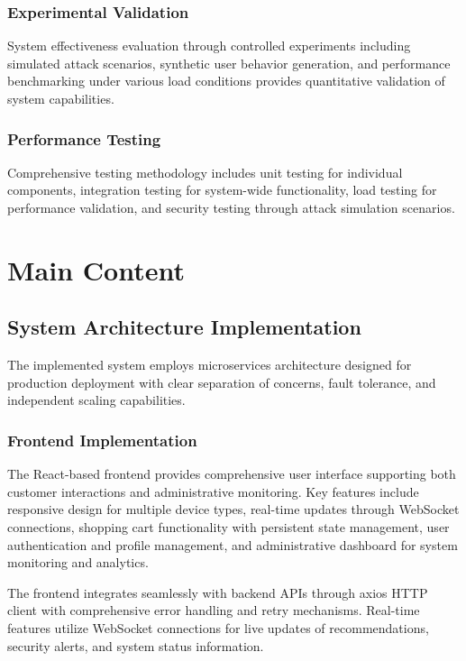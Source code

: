 \documentclass[12pt]{article}
\begin{document}
\subsubsection{Experimental Validation}
System effectiveness evaluation through controlled experiments including simulated attack scenarios, synthetic user behavior generation, and performance benchmarking under various load conditions provides quantitative validation of system capabilities.

\subsubsection{Performance Testing}
Comprehensive testing methodology includes unit testing for individual components, integration testing for system-wide functionality, load testing for performance validation, and security testing through attack simulation scenarios.

\section{Main Content}

\subsection{System Architecture Implementation}
The implemented system employs microservices architecture designed for production deployment with clear separation of concerns, fault tolerance, and independent scaling capabilities.

\subsubsection{Frontend Implementation}
The React-based frontend provides comprehensive user interface supporting both customer interactions and administrative monitoring. Key features include responsive design for multiple device types, real-time updates through WebSocket connections, shopping cart functionality with persistent state management, user authentication and profile management, and administrative dashboard for system monitoring and analytics.

The frontend integrates seamlessly with backend APIs through axios HTTP client with comprehensive error handling and retry mechanisms. Real-time features utilize WebSocket connections for live updates of recommendations, security alerts, and system status information.
\end{document}

